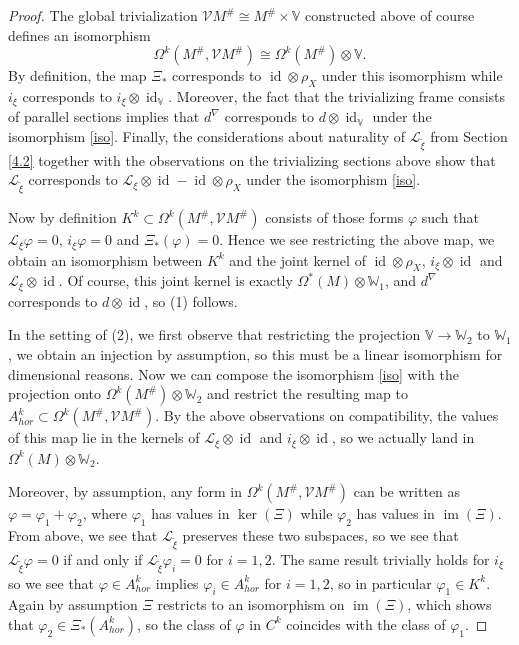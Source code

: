 \documentclass[12pt,a4paper]{amsart}
\def\Bbb{\mathbb}
\def\Cal{\mathcal}
\let\phi\varphi
\newcommand{\x}{\times}
\newcommand{\ph}{\phi}
\newcommand{\Om}{\Omega}
\newcommand{\im}{\operatorname{im}}
\renewcommand{\Im}{\operatorname{im}}
\newcommand{\id}{\operatorname{id}}
\numberwithin{theorem}{section}
\theoremstyle{definition}
\theoremstyle{remark}
\begin{document}
\begin{proof}
  The global trivialization $\Cal VM^\#\cong M^\#\x\Bbb V$ constructed
  above of course defines an isomorphism 
\begin{equation}\label{iso}
\Om^k(M^\#,\Cal VM^\#)\cong\Om^k(M^\#)\otimes\Bbb V.
\end{equation} 
By definition, the map $\Xi_*$ corresponds to $\id\otimes\rho_X$ under
this isomorphism while $i_\xi$ corresponds to $i_\xi\otimes\id_{\Bbb
  V}$. Moreover, the fact that the trivializing frame consists of
parallel sections implies that $d^\nabla$ corresponds to
$d\otimes\id_{\Bbb V}$ under the isomorphism \eqref{iso}. Finally, the
considerations about naturality of $\Cal L_{\tilde\xi}$ from Section
\ref{4.2} together with the observations on the trivializing sections
above show that $\Cal L_{\tilde\xi}$ corresponds to $\Cal
L_\xi\otimes\id-\id\otimes\rho_X$ under the isomorphism \eqref{iso}.

  Now by definition $K^k\subset \Om^k(M^\#,\Cal VM^\#)$ consists of
  those forms $\ph$ such that $\Cal L_\xi\ph=0$, $i_\xi\ph=0$ and
  $\Xi_*(\ph)=0$. Hence we see restricting the above map, we obtain an
  isomorphism between $K^k$ and the joint kernel of
  $\id\otimes\rho_X$, $i_\xi\otimes\id$ and  $\Cal
  L_\xi\otimes\id$. Of course, this joint kernel is exactly
  $\Om^*(M)\otimes\Bbb W_1$, and $d^\nabla$ corresponds to
  $d\otimes\id$, so (1) follows. 

  In the setting of (2), we first observe that restricting the
  projection $\Bbb V\to\Bbb W_2$ to $\Bbb W_1$, we obtain an injection
  by assumption, so this must be a linear isomorphism for dimensional
  reasons. Now we can compose the isomorphism \eqref{iso} with the
  projection onto $\Om^k(M^\#)\otimes\Bbb W_2$ and restrict the
  resulting map to $A^k_{hor}\subset \Om^k(M^\#,\Cal VM^\#)$. By the
  above observations on compatibility, the values of this map lie in
  the kernels of $\Cal L_\xi\otimes\id$ and $i_\xi\otimes\id$, so we
  actually land in $\Om^k(M)\otimes\Bbb W_2$. 

  Moreover, by assumption, any form in $\Om^k(M^\#,\Cal VM^\#)$ can be
  written as $\ph=\ph_1+\ph_2$, where $\ph_1$ has values in
  $\ker(\Xi)$ while $\ph_2$ has values in $\im(\Xi)$. From above, we
  see that $\Cal L_{\tilde\xi}$ preserves these two subspaces, so we
  see that $\Cal L_{\tilde\xi}\ph=0$ if and only if $\Cal
  L_{\tilde\xi}\ph_i=0$ for $i=1,2$. The same result trivially holds
  for $i_\xi$ so we see that $\ph\in A^k_{hor}$ implies $\ph_i\in
  A^k_{hor}$ for $i=1,2$, so in particular $\ph_1\in K^k$. Again by
  assumption $\Xi$ restricts to an isomorphism on $\Im(\Xi)$, which
  shows that $\ph_2\in\Xi_*(A^k_{hor})$, so the class of $\ph$ in
  $C^k$ coincides with the class of $\ph_1$.


\end{proof}
\end{document}
